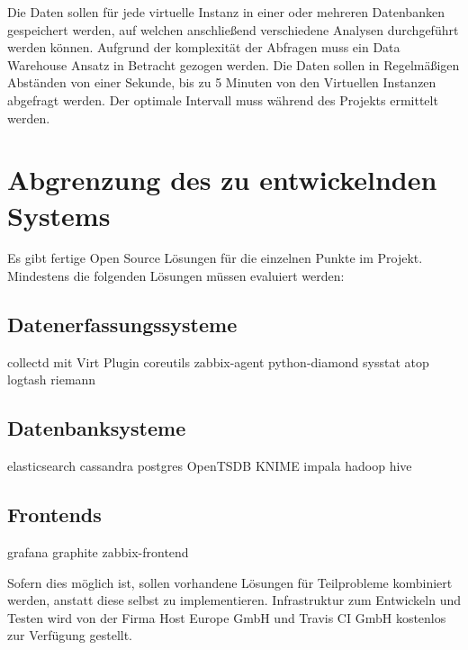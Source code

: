 Die Daten sollen für jede virtuelle Instanz in einer oder mehreren Datenbanken
gespeichert werden, auf welchen anschließend verschiedene Analysen
durchgeführt werden können. Aufgrund der komplexität der Abfragen muss ein
Data Warehouse Ansatz in Betracht gezogen werden. Die Daten sollen in
Regelmäßigen Abständen von einer Sekunde, bis zu 5 Minuten von den Virtuellen
Instanzen abgefragt werden. Der optimale Intervall muss während des Projekts
ermittelt werden.

\section{Abgrenzung des zu entwickelnden Systems}

Es gibt fertige Open Source Lösungen für die einzelnen Punkte im Projekt.
Mindestens die folgenden Lösungen müssen evaluiert werden:

\subsection{Datenerfassungssysteme}

\begin{outline}
  \1 collectd mit Virt Plugin
  \1 coreutils
  \1 zabbix-agent
  \1 python-diamond
  \1 sysstat
  \1 atop
  \1 logtash
  \1 riemann
\end{outline}

\subsection{Datenbanksysteme}

\begin{outline}
  \1 elasticsearch
  \1 cassandra
  \1 postgres
  \1 OpenTSDB
  \1 KNIME
  \1 impala
  \1 hadoop
  \1 hive
\end{outline}

\subsection{Frontends}

\begin{outline}
  \1 grafana
  \1 graphite
  \1 zabbix-frontend
\end{outline}

Sofern dies möglich ist, sollen vorhandene Lösungen für Teilprobleme
kombiniert werden, anstatt diese selbst zu implementieren. Infrastruktur zum
Entwickeln und Testen wird von der Firma Host Europe GmbH und Travis CI GmbH
kostenlos zur Verfügung gestellt.

